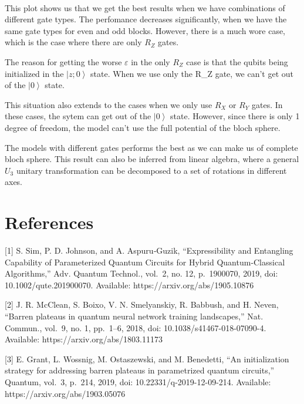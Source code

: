 \documentclass[11pt]{article}
\begin{document}
    \begin{center}
    \end{center}
    { \hspace*{\fill} \\}
    
    This plot shows us that we get the best results when we have
combinations of different gate types. The perfomance decreases
significantly, when we have the same gate types for even and odd blocks.
However, there is a much wore case, which is the case where there are
only \(R_Z\) gates.

The reason for getting the worse \(\varepsilon\) in the only \(R_Z\)
case is that the qubits being initialized in the
\(\newcommand{\ket}[1]{\left|{#1}\right\rangle} \ket{z;0}\) state. When
we use only the R\_Z gate, we can't get out of the
\(\newcommand{\ket}[1]{\left|{#1}\right\rangle} \ket{0}\) state.

This situation also extends to the cases when we only use \(R_X\) or
\(R_Y\) gates. In these cases, the sytem can get out of the
\(\newcommand{\ket}[1]{\left|{#1}\right\rangle} \ket{0}\) state.
However, since there is only 1 degree of freedom, the model can't use
the full potential of the bloch sphere.

The models with different gates performs the best as we can make us of
complete bloch sphere. This result can also be inferred from linear
algebra, where a general \(U_3\) unitary transformation can be
decomposed to a set of rotations in different axes.

    \hypertarget{references}{%
\section{References}\label{references}}

{[}1{]} S. Sim, P. D. Johnson, and A. Aspuru‐Guzik, ``Expressibility and
Entangling Capability of Parameterized Quantum Circuits for Hybrid
Quantum‐Classical Algorithms,'' Adv. Quantum Technol., vol.~2, no. 12,
p.~1900070, 2019, doi: 10.1002/qute.201900070. Available:
https://arxiv.org/abs/1905.10876

{[}2{]} J. R. McClean, S. Boixo, V. N. Smelyanskiy, R. Babbush, and H.
Neven, ``Barren plateaus in quantum neural network training
landscapes,'' Nat. Commun., vol.~9, no. 1, pp.~1--6, 2018, doi:
10.1038/s41467-018-07090-4. Available: https://arxiv.org/abs/1803.11173

{[}3{]} E. Grant, L. Wossnig, M. Ostaszewski, and M. Benedetti, ``An
initialization strategy for addressing barren plateaus in parametrized
quantum circuits,'' Quantum, vol.~3, p.~214, 2019, doi:
10.22331/q-2019-12-09-214. Available: https://arxiv.org/abs/1903.05076
\end{document}
